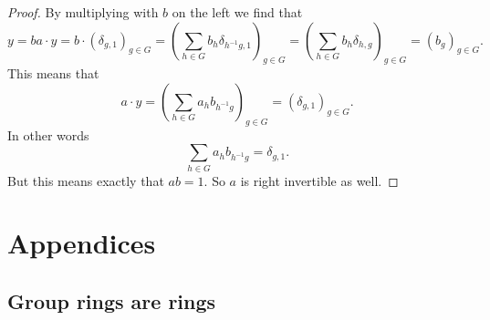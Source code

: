 \documentclass[titlepage, a4paper]{article}
\theoremstyle{remark}
\begin{document}
\begin{proof}
		By multiplying with $b$ on the left we find that \[
			 y = ba\cdot y = b\cdot (\delta_{g, 1})_{g \in G} = \left( \sum_{h \in G} b_{h} \delta_{h^{-1}g, 1} \right)_{g \in G} = \left( \sum_{h \in G} b_{h} \delta_{h, g} \right)_{g \in G}
		 = \left( b_{g} \right) _{g \in G}.\] 
		This means that \[
		a\cdot y = \left( \sum_{h \in G} a_h b_{h^{-1}g} \right)_{g \in G} = \left( \delta_{g, 1} \right) _{g \in G} 
	.\] 
	In other words
	\[
	\sum_{h \in G} a_h b_{h^{-1}g} = \delta_{g, 1}
	.\]
	But this means exactly that $ab = 1$. So  $a$ is right invertible as well. 
	\end{proof}	
	
	\pagebreak

	\section{Appendices}
	
	\subsection{Group rings are rings}\label{sec:proof_groupring}
	
\end{document}
